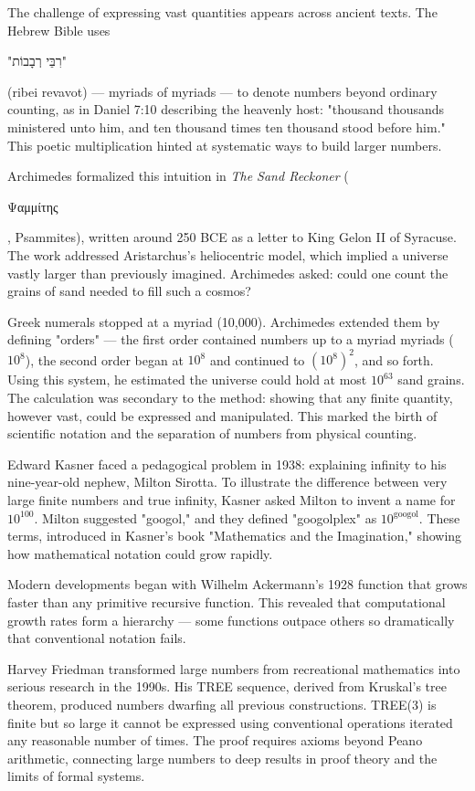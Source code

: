 
\begin{historical}
    The challenge of expressing vast quantities appears across ancient texts. The Hebrew Bible uses \begin{hebrew}"רִבֵּי רְבָבוֹת"\end{hebrew} (ribei revavot) — myriads of myriads — to denote numbers beyond ordinary counting, as in Daniel 7:10 describing the heavenly host: "thousand thousands ministered unto him, and ten thousand times ten thousand stood before him." This poetic multiplication hinted at systematic ways to build larger numbers.

Archimedes formalized this intuition in \textit{The Sand Reckoner} (\begin{greek}Ψαμμίτης\end{greek}, Psammites), written around 250 BCE as a letter to King Gelon II of Syracuse. The work addressed Aristarchus's heliocentric model, which implied a universe vastly larger than previously imagined. Archimedes asked: could one count the grains of sand needed to fill such a cosmos? 

Greek numerals stopped at a myriad (10,000). Archimedes extended them by defining "orders" — the first order contained numbers up to a myriad myriads ($10^8$), the second order began at $10^8$ and continued to $(10^8)^2$, and so forth. Using this system, he estimated the universe could hold at most $10^{63}$ sand grains. The calculation was secondary to the method: showing that any finite quantity, however vast, could be expressed and manipulated. This marked the birth of scientific notation and the separation of numbers from physical counting.

Edward Kasner faced a pedagogical problem in 1938: explaining infinity to his nine-year-old nephew, Milton Sirotta. To illustrate the difference between very large finite numbers and true infinity, Kasner asked Milton to invent a name for $10^{100}$. Milton suggested "googol," and they defined "googolplex" as $10^{\text{googol}}$. These terms, introduced in Kasner's book "Mathematics and the Imagination," showing how mathematical notation could grow rapidly.

Modern developments began with Wilhelm Ackermann's 1928 function that grows faster than any primitive recursive function. This revealed that computational growth rates form a hierarchy — some functions outpace others so dramatically that conventional notation fails.

Harvey Friedman transformed large numbers from recreational mathematics into serious research in the 1990s. His TREE sequence, derived from Kruskal's tree theorem, produced numbers dwarfing all previous constructions. TREE(3) is finite but so large it cannot be expressed using conventional operations iterated any reasonable number of times. The proof requires axioms beyond Peano arithmetic, connecting large numbers to deep results in proof theory and the limits of formal systems.
\end{historical}